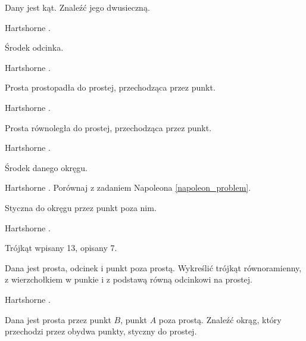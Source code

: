 \begin{geoconstruction}
    Dany jest kąt.
    Znaleźć jego dwusieczną.
%
\end{geoconstruction}

Hartshorne \cite[s. 23]{hartshorne2000}. %

\begin{problem}
    Środek odcinka.
\end{problem}

Hartshorne \cite[s. 23]{hartshorne2000}. %

\begin{problem}
    Prosta prostopadła do prostej, przechodząca przez punkt.
\end{problem} %

Hartshorne \cite[s. 23, 24]{hartshorne2000}.

\begin{problem}
    Prosta równoległa do prostej, przechodząca przez punkt.
\end{problem} %

Hartshorne \cite[s. 24]{hartshorne2000}.

\begin{problem}
    Środek danego okręgu.
\end{problem} %

Hartshorne \cite[s. 24]{hartshorne2000}.
Porównaj z zadaniem Napoleona \ref{napoleon_problem}.

\begin{problem}
    Styczna do okręgu przez punkt poza nim.
\end{problem} %

Hartshorne \cite[s. 24]{hartshorne2000}.

Trójkąt wpisany 13, opisany 7. %

\begin{problem}
    Dana jest prosta, odcinek i punkt poza prostą.
    Wykreślić trójkąt równoramienny, z wierzchołkiem w punkie i z podstawą równą odcinkowi na prostej.
\end{problem} %

Hartshorne \cite[s. 25]{hartshorne2000}.

\begin{problem}
    Dana jest prosta przez punkt $B$, punkt $A$ poza prostą.
    Znaleźć okrąg, który przechodzi przez obydwa punkty, styczny do prostej.
\end{problem} %


